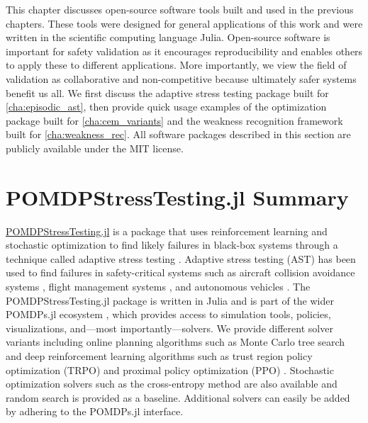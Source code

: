 This chapter discusses open-source software tools built and used in the previous chapters.
These tools were designed for general applications of this work and were written in the scientific computing language Julia.
Open-source software is important for safety validation as it encourages reproducibility and enables others to apply these to different applications.
More importantly, we view the field of validation as collaborative and non-competitive because ultimately safer systems benefit us all.
We first discuss the adaptive stress testing package built for \cref{cha:episodic_ast}, then provide quick usage examples of the optimization package built for \cref{cha:cem_variants} and the weakness recognition framework built for \cref{cha:weakness_rec}. All software packages described in this section are publicly available under the MIT license.


\section{POMDPStressTesting.jl Summary}\label{sec:pomdpstresstesting}
\href{https://github.com/sisl/POMDPStressTesting.jl}{POMDPStressTesting.jl} is a package that uses reinforcement learning and stochastic optimization to find likely failures in black-box systems through a technique called adaptive stress testing \cite{lee2019adaptive}.
Adaptive stress testing (AST) has been used to find failures in safety-critical systems such as aircraft collision avoidance systems \cite{lee2015adaptive}, flight management systems \cite{moss2020adaptive}, and autonomous vehicles \cite{koren2018adaptive}.
The POMDPStressTesting.jl package is written in Julia \cite{bezanson2017julia} and is part of the wider POMDPs.jl ecosystem \cite{pomdps_jl}, which provides access to simulation tools, policies, visualizations, and---most importantly---solvers.
We provide different solver variants including online planning algorithms such as Monte Carlo tree search \cite{coulom2006efficient} and deep reinforcement learning algorithms such as trust region policy optimization (TRPO) \cite{trpo} and proximal policy optimization (PPO) \cite{ppo}.
Stochastic optimization solvers such as the cross-entropy method \cite{rubinstein1999cross} are also available and random search is provided as a baseline.
Additional solvers can easily be added by adhering to the POMDPs.jl interface.


